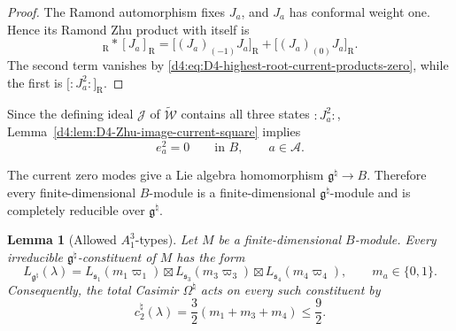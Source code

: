 \documentclass[11pt,reqno]{amsart}
\newtheorem{lemma}[theorem]{Lemma}
\theoremstyle{definition}
\theoremstyle{remark}
\begin{document}
\begin{proof}
The Ramond automorphism fixes \(J_a\), and \(J_a\) has conformal weight
one.  Hence its Ramond Zhu product with itself is
\begin{equation*}
  [J_a]_{\mathrm R}*[J_a]_{\mathrm R}
  =\bigl[(J_a)_{(-1)}J_a\bigr]_{\mathrm R}
   +\bigl[(J_a)_{(0)}J_a\bigr]_{\mathrm R}.
\end{equation*}
The second term vanishes by
\eqref{d4:eq:D4-highest-root-current-products-zero}, while the first is
\(\bigl[:J_a^2:\bigr]_{\mathrm R}\).
\end{proof}

Since the defining ideal \(\mathcal J\) of
\(\widetilde{\mathcal W}\) contains all three states \(:J_a^2:\),
Lemma~\ref{d4:lem:D4-Zhu-image-current-square} implies
\begin{equation}
  e_a^2=0
  \qquad\text{in }B,
  \qquad a\in\mathcal A.
  \label{d4:eq:D4-three-highest-root-square-zero-relations}
\end{equation}

The current zero modes give a Lie algebra homomorphism
\(\mathfrak g^\natural\to B\).  Therefore every finite-dimensional
\(B\)-module is a finite-dimensional
\(\mathfrak g^\natural\)-module and is completely reducible over
\(\mathfrak g^\natural\).

\begin{lemma}[Allowed \(A_1^3\)-types]
\label{d4:lem:D4-allowed-A1-cubed-types}
Let \(M\) be a finite-dimensional \(B\)-module.  Every irreducible
\(\mathfrak g^\natural\)-constituent of \(M\) has the form
\begin{equation}
  L_{\mathfrak g^\natural}(\lambda)
  =L_{\mathfrak s_1}(m_1\varpi_1)
   \boxtimes
   L_{\mathfrak s_3}(m_3\varpi_3)
   \boxtimes
   L_{\mathfrak s_4}(m_4\varpi_4),
  \qquad
  m_a\in\{0,1\}.
  \label{d4:eq:D4-allowed-A1-cubed-types}
\end{equation}
Consequently, the total Casimir \(\Omega^\natural\) acts on every such
constituent by
\begin{equation}
  c_2^\natural(\lambda)
  =\frac32(m_1+m_3+m_4)
  \le\frac92.
  \label{d4:eq:D4-total-Casimir-bound-allowed-types}
\end{equation}
\end{lemma}
\end{document}
